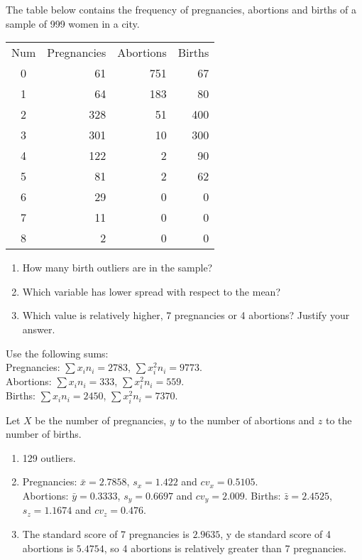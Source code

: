 {The table below contains the frequency of pregnancies, abortions and births of a sample of 999 women in a city.

\begin{center}
\begin{tabular}{crrr}
\toprule
Num & Pregnancies & Abortions & Births\\
0 & 61 & 751 & 67 \\
1 & 64 & 183 & 80 \\
2 & 328 & 51 & 400 \\
3 & 301 & 10 & 300 \\
4 & 122 & 2 & 90 \\
5 & 81 & 2 & 62 \\
6 & 29 & 0 & 0 \\
7 & 11 & 0 & 0 \\
8 & 2 & 0 & 0 \\
\bottomrule
\end{tabular}
\end{center}

\begin{enumerate}
\item How many birth outliers are in the sample?
\item Which variable has lower spread with respect to the mean?
\item Which value is relatively higher, 7 pregnancies or 4 abortions? Justify your answer.
\end{enumerate}

Use the following sums:\\
Pregnancies: $\sum x_in_i= 2783$, $\sum x_i^2n_i=9773$.\\
Abortions: $\sum x_in_i= 333$, $\sum x_i^2n_i=559$.\\
Births: $\sum x_in_i= 2450$, $\sum x_i^2n_i=7370$.
}
{
Let $X$ be the number of pregnancies, $y$ to the number of abortions and $z$ to the number of births.
\begin{enumerate}
\item 129 outliers.
\item Pregnancies: $\bar{x}=2.7858$, $s_x=1.422$ and $cv_x=0.5105$.\\
Abortions: $\bar{y}=0.3333$, $s_y=0.6697$ and $cv_y=2.009$.
Births: $\bar{z}=2.4525$, $s_z=1.1674$ and $cv_z=0.476$.
\item The standard score of 7 pregnancies is $2.9635$, y de standard score of 4 abortions is $5.4754$, so 4 abortions is relatively greater than 7 pregnancies.
\end{enumerate}
}
{
}

